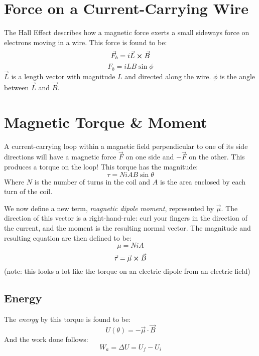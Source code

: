 \documentclass[]{article}
\begin{document}
\section{Force on a Current-Carrying Wire}
The Hall Effect describes how a magnetic force exerts a small sideways force on electrons moving in a wire. This force is found to be:
\[ \vec{F}_b = i\vec{L} \cross \vec{B} \]
\[ F_b = iLB \sin \phi \]
$ \vec{L} $ is a length vector with magnitude $ L $ and directed along the wire. $ \phi $ is the angle between $ \vec{L} $ and $ \vec{B} $.

\section{Magnetic Torque \& Moment}
A current-carrying loop within a magnetic field perpendicular to one of its side directions will have a magnetic force $ \vec{F} $ on one side and $ -\vec{F} $ on the other. This produces a torque on the loop! This torque has the magnitude:
\[ \tau = NiAB \sin \theta \]
Where $ N $ is the number of turns in the coil and $ A $ is the area enclosed by each turn of the coil.

We now define a new term, \emph{magnetic dipole moment}, represented by $ \vec{\mu} $. The direction of this vector is a right-hand-rule: curl your fingers in the direction of the current, and the moment is the resulting normal vector. The magnitude and resulting equation are then defined to be:
\[ \mu = NiA \]
\[ \vec{\tau} = \vec{\mu} \cross \vec{B} \]
(note: this looks a lot like the torque on an electric dipole from an electric field)

\subsection{Energy}
The \emph{energy} by this torque is found to be:
\[ U(\theta) = -\vec{\mu} \cdot \vec{B} \]
And the work done follows:
\[ W_a = \Delta U = U_f - U_i \]
\end{document}
